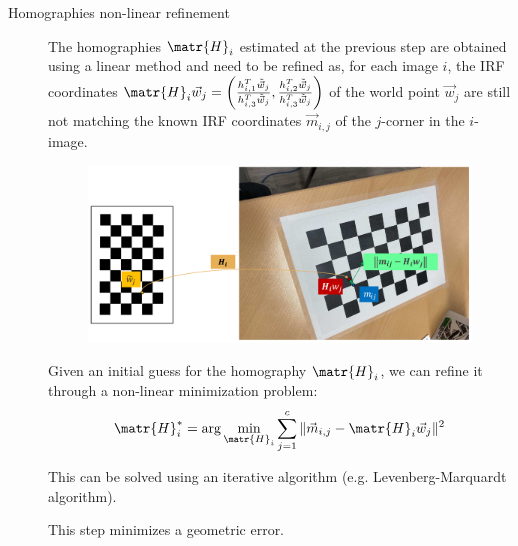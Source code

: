 \begin{description}
    \item[Homographies non-linear refinement]
        The homographies $\matr{H}_i$ estimated at the previous step are obtained using a linear method and need to be refined as, for each image $i$, 
        the IRF coordinates $\matr{H}_i\vec{w}_j = \left( \frac{h_{i, 1}^T \tilde{\vec{w}}_j}{h_{i, 3}^T \tilde{\vec{w}}_j}, \frac{h_{i, 2}^T \tilde{\vec{w}}_j}{h_{i, 3}^T \tilde{\vec{w}}_j} \right)$
        of the world point $\vec{w}_j$ are still not matching the known IRF coordinates $\vec{m}_{i,j}$ of the $j$-corner in the $i$-image.
        \begin{figure}[H]
            \centering
            \includegraphics[width=0.7\linewidth]{./img/_homography_refinement.pdf}
        \end{figure}

        Given an initial guess for the homography $\matr{H}_i$, we can refine it through a non-linear minimization problem:
        \[ \matr{H}_i^* = \arg\min_{\matr{H}_i} \sum_{j=1}^{c} \Vert \vec{m}_{i,j} - \matr{H}_i \vec{w}_j \Vert^2 \]

        This can be solved using an iterative algorithm (e.g. Levenberg-Marquardt algorithm).

        \begin{remark}
            This step minimizes a geometric error.
        \end{remark}


\end{description}
